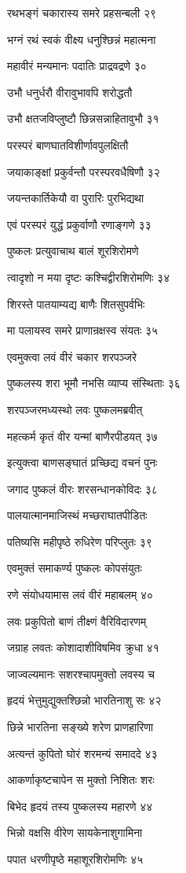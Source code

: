 रथभङ्गं चकारास्य समरे प्रहसन्बली २९

भग्नं रथं स्वकं वीक्ष्य धनुश्छिन्नं महात्मना

महावीरं मन्यमानः पदातिः प्राद्रवद्रणे ३०

उभौ धनुर्धरौ वीरावुभावपि शरोद्धतौ

उभौ क्षतजविप्लुष्टौ छिन्नसन्नाहितावुभौ ३१

परस्परं बाणघातविशीर्णावपुलक्षितौ

जयाकाङ्क्षां प्रकुर्वन्तौ परस्परवधैषिणौ ३२

जयन्तकार्तिकेयौ वा पुरारिः पुरभिद्यथा

एवं परस्परं युद्धं प्रकुर्वाणौ रणाङ्गणे ३३

पुष्कलः प्रत्युवाचाथ बालं शूरशिरोमणे

त्वादृशो न मया दृष्टः कश्चिद्वीरशिरोमणिः ३४

शिरस्ते पातयाम्यद्य बाणैः शितसुपर्वभिः

मा पलायस्व समरे प्राणान्रक्षस्व संयतः ३५

एवमुक्त्वा लवं वीरं चकार शरपञ्जरे

पुष्कलस्य शरा भूमौ नभसि व्याप्य संस्थिताः ३६

शरपञ्जरमध्यस्थो लवः पुष्कलमब्रवीत्

महत्कर्म कृतं वीर यन्मां बाणैरपीडयत् ३७

इत्युक्त्वा बाणसङ्घातं प्रच्छिद्य वचनं पुनः

जगाद पुष्कलं वीरः शरसन्धानकोविदः ३८

पालयात्मानमाजिस्थं मच्छराघातपीडितः

पतिष्यसि महीपृष्ठे रुधिरेण परिप्लुतः ३९

एवमुक्तं समाकर्ण्य पुष्कलः कोपसंयुतः

रणे संयोधयामास लवं वीरं महाबलम् ४०

लवः प्रकुपितो बाणं तीक्ष्णं वैरिविदारणम्

जग्राह लवतः कोशादाशीविषमिव क्रुधा ४१

जाज्वल्यमानः सशरश्चापमुक्तो लवस्य च

हृदयं भेत्तुमुद्युक्तश्छिन्नो भारतिनाशु सः ४२

छिन्ने भारतिना सङ्ख्ये शरेण प्राणहारिणा

अत्यन्तं कुपितो घोरं शरमन्यं समाददे ४३

आकर्णाकृष्टचापेन स मुक्तो निशितः शरः

बिभेद हृदयं तस्य पुष्कलस्य महारणे ४४

भिन्नो वक्षसि वीरेण सायकेनाशुगामिना

पपात धरणीपृष्ठे महाशूरशिरोमणिः ४५

